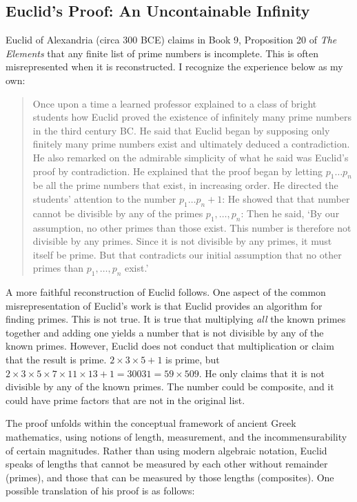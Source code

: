 \documentclass[12pt]{book}
\begin{document}
\subsection{Euclid's Proof: An Uncontainable Infinity}
Euclid of Alexandria (circa 300 BCE) claims in Book 9, Proposition 20 of \textit{The Elements}\parencite*{euclid_euclids_2007} that any finite list of prime numbers is incomplete. This is often misrepresented when it is reconstructed.  I recognize the experience below as my own:
\begin{quotation}
    Once upon a time a learned professor explained to a class of bright students how Euclid proved the existence of infinitely many prime numbers in the third century BC. He said that Euclid began by supposing only finitely many prime numbers exist and ultimately deduced a contradiction. He also remarked on the admirable simplicity of what he said was Euclid's proof by contradiction. He explained that the proof began by letting $p_1 \ldots p_n$ be all the prime numbers that exist, in increasing order. He directed the students' attention to the number $p_1\ldots p_n+1$: He showed that that number cannot be divisible by any of the primes $p_1,\ldots, p_n$: Then he said,  `By our assumption, no other primes than those exist. This number is therefore not divisible by any primes. Since it is not divisible by any primes, it must itself be prime. But that contradicts our initial assumption that no other primes than $p_1, \ldots, p_n$ exist.'\parencite{hardy2009prime} 
\end{quotation}

A more faithful reconstruction of Euclid follows. One aspect of the common misrepresentation of Euclid's work is that Euclid provides an algorithm for finding primes. This is not true. It is true that multiplying \textit{all} the known primes together and adding one yields a number that is not divisible by any of the known primes. However, Euclid does not conduct that multiplication or claim that the result is prime. $2\times 3 \times 5 + 1$ is prime, but $2\times 3 \times 5 \times 7\times 11\times 13+1=30031=59\times 509$. He only claims that it is not divisible by any of the known primes. The number could be composite, and it could have prime factors that are not in the original list.



The proof unfolds within the conceptual framework of ancient Greek mathematics, using notions of length, measurement, and the incommensurability of certain magnitudes. Rather than using modern algebraic notation, Euclid speaks of lengths that cannot be measured by each other without remainder (primes), and those that can be measured by those lengths (composites). One possible translation of his proof is as follows:
\end{document}
